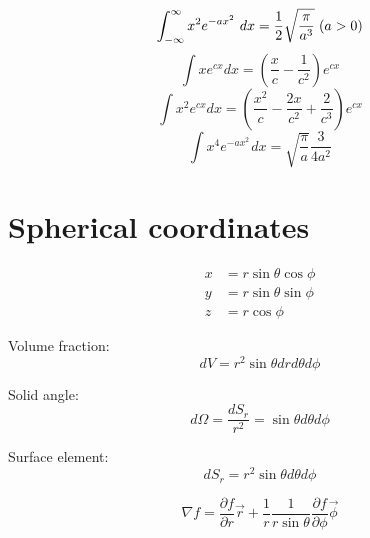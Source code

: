 \documentclass[12pt,a4paper]{article}
\begin{document}
		\begin{equation}
			\int_{-\infty}^\infty x^2 e^{-ax^2}\ {dx} = \frac{1}{2} \sqrt{\frac{\pi}{a^3}} \hspace*{3pt} (a > 0)
		\end{equation}
		\begin{equation}
			\int x e^{cx} dx = \left(\frac{x}{c}-\frac{1}{c^2}\right) e^{cx}
		\end{equation}
		\begin{equation}
			\int x^2 e^{cx} dx = \left(\frac{x^2}{c} - \frac{2x}{c^2} + \frac{2}{c^3}\right) e^{cx}
		\end{equation}
		\begin{equation}
			\int x^4 e^{-ax^2}\hspace{1pt} dx = \sqrt{\dfrac{\pi }{a}} \dfrac{3}{4a^2}
		\end{equation}
		
	\section*{Spherical coordinates}
	\begin{align*}
		x &= r \sin \theta \cos \phi \\
		y &= r \sin \theta \sin \phi \\
		z &= r \cos \phi
	\end{align*}
	
	\vspace{.1in}
	Volume fraction: 
	\[ dV = r^2 \sin \theta dr d\theta d\phi \]
	
	\vspace{.1in}
	Solid angle: 
	\[ d\Omega = \frac{dS_r}{r^2} = \sin\theta d\theta d\phi \]
	
	\vspace{.1in}
	Surface element: 
	\[ dS_r = r^2 \sin\theta d\theta d\phi \]
		
		
\begin{equation}
	\nabla f = \frac{\partial f}{\partial r} \vec{r} + \frac{1}{r} \frac{1}{r \sin \theta} \frac{\partial f}{\partial \phi} \vec{\phi}
\end{equation}
\end{document}
